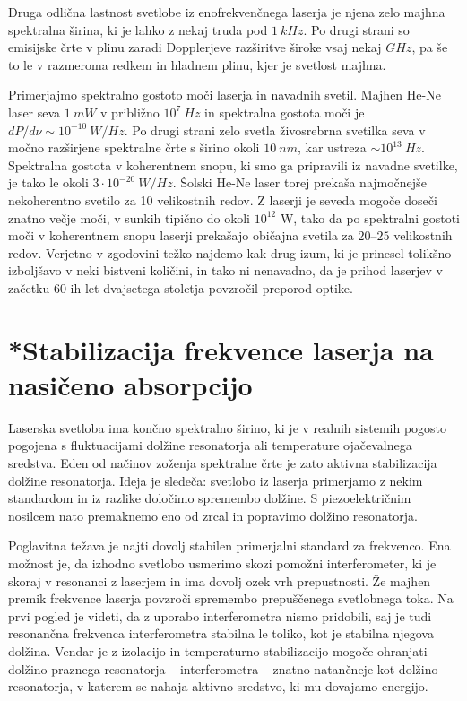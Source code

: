 Druga odlična lastnost svetlobe iz enofrekvenčnega laserja je njena zelo majhna
spektralna širina, ki je lahko z nekaj truda pod $1~\si{kHz}$. Po drugi strani so emisijske 
črte v plinu zaradi Dopplerjeve razširitve široke vsaj nekaj $\si{GHz}$, 
pa še to le v razmeroma redkem in hladnem plinu, kjer je svetlost majhna.

Primerjajmo spektralno gostoto moči laserja in navadnih svetil. Majhen He-Ne
laser seva $1~\si{mW}$ v približno $10^{7}~\si{Hz}$ in spektralna gostota
moči je $dP/d\nu \sim 10^{-10}~\si{W/Hz}$. Po drugi strani zelo svetla 
živosrebrna svetilka seva v močno razširjene spektralne črte s širino okoli 
$10~\si{nm}$, kar ustreza $\sim 10^{13}~\si{Hz}$. 
Spektralna gostota v koherentnem snopu, ki smo ga pripravili iz
navadne svetilke, je tako le okoli $3\cdot 10^{-20}~\si{W/Hz}$. Šolski
He-Ne laser torej prekaša najmočnejše nekoherentno svetilo za 10
velikostnih redov. Z laserji je seveda mogoče doseči znatno večje
moči, v sunkih tipično do okoli $10^{12}$ W, tako da po spektralni gostoti moči v
koherentnem snopu laserji prekašajo običajna svetila za $20$--$25$
velikostnih redov. Verjetno v zgodovini težko najdemo kak drug izum, 
ki je prinesel tolikšno izboljšavo v neki bistveni količini, in tako ni 
nenavadno, da je prihod laserjev v začetku 60-ih let dvajsetega stoletja povzročil preporod optike.

\section{*Stabilizacija frekvence laserja na nasičeno absorpcijo}
\label{chap:stabilizacija}
Laserska svetloba ima končno spektralno širino, ki 
je v realnih sistemih pogosto pogojena s fluktuacijami dolžine resonatorja ali 
temperature ojačevalnega sredstva. Eden od načinov 
zoženja spektralne črte je zato aktivna stabilizacija
dolžine resonatorja. Ideja je sledeča: svetlobo iz laserja primerjamo
z nekim standardom in iz razlike določimo spremembo dolžine. S
piezoelektričnim nosilcem nato premaknemo eno od zrcal in popravimo 
dolžino resonatorja. 

Poglavitna težava je najti dovolj stabilen primerjalni standard za frekvenco. 
Ena možnost je, da izhodno svetlobo usmerimo skozi pomožni 
interferometer, 
ki je skoraj v resonanci z laserjem in ima dovolj ozek vrh prepustnosti. Že majhen 
premik frekvence laserja povzroči spremembo prepuščenega svetlobnega toka. 
Na prvi pogled je videti, da z uporabo interferometra nismo pridobili, 
saj je tudi resonančna frekvenca interferometra stabilna le toliko, kot je 
stabilna njegova dolžina. Vendar je z izolacijo in temperaturno stabilizacijo 
mogoče ohranjati dolžino praznega resonatorja -- interferometra -- znatno
natančneje kot dolžino resonatorja, v katerem se nahaja aktivno sredstvo, ki mu 
dovajamo energijo.

